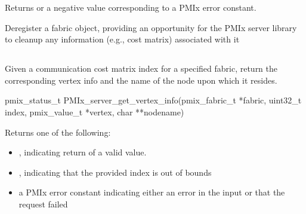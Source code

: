 \begin{arglist}
\end{arglist}

Returns  or a negative value corresponding to a \ac{PMIx} error constant.

\descr

Deregister a fabric object, providing an opportunity for the \ac{PMIx} server library to cleanup any information (e.g., cost matrix) associated with it


\subsection{}

\summary

Given a communication cost matrix index for a specified fabric, return the corresponding vertex info and the name of the node upon which it resides.

\format

\cspecificstart
\begin{codepar}
pmix_status_t
PMIx_server_get_vertex_info(pmix_fabric_t *fabric,
                            uint32_t index, pmix_value_t *vertex,
                            char **nodename)
\end{codepar}
\cspecificend

\begin{arglist}
\end{arglist}

Returns one of the following:

\begin{itemize}
    \item {}, indicating return of a valid value.
    \item {}, indicating that the provided index is out of bounds
    \item a \ac{PMIx} error constant indicating either an error in the input or that the request failed
\end{itemize}

